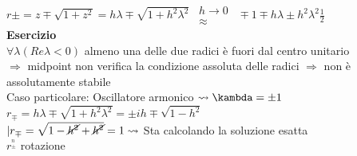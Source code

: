 \documentclass[12px]{article}
\begin{document}
	  $r\pm = z \mp \sqrt{1 + z^2} = h\lambda \mp \sqrt{1 + h^2 \lambda^2} \ \ \substack{ h \rightarrow 0\\ \approx} \ \ \mp 1 \mp h\lambda \pm h^2 \lambda^2  \frac 12$\\
	  \textbf{Esercizio}\\
	  $\forall \lambda (Re \lambda <0)$ almeno una delle due radici è fuori dal centro unitario\\
	   $ \Rightarrow $ midpoint non verifica la condizione assoluta delle radici $ \Rightarrow $ non è assolutamente stabile\\
	   Caso particolare: Oscillatore armonico $\leadsto \kambda = \pm 1$ 
	   $r_{\mp} = h \lambda \mp \sqrt{1 + h^2\lambda^2} = \pm i h \mp \sqrt{1 - h^2}$\\
	   $|r_{\mp} = \sqrt{1 - \cancel{h^2} +\cancel{h^2}} = 1 \leadsto$ Sta calcolando la soluzione esatta\\
	   $r^_{\pm}^n$ rotazione
\end{document}
